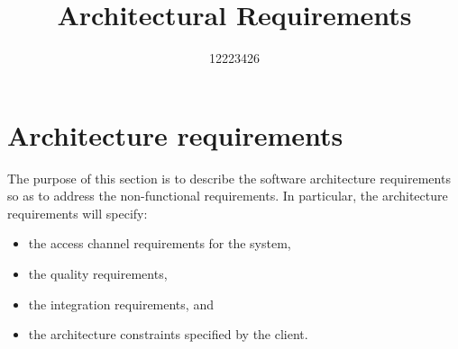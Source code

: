 \documentclass[11pt,a4paper]{article}
\begin{document}
\begin{titlepage}
\title{Architectural Requirements}
\author{12223426}
\maketitle
\end{titlepage}

\section{Architecture requirements}
The purpose of this section is to describe the software architecture requirements so as to address the non-functional requirements. In particular, the architecture requirements will specify:
\begin{itemize}
	\item the access channel requirements for the system,
	\item the quality requirements,
	\item the integration requirements, and
	\item the architecture constraints specified by the client.
\end{itemize}
 
\end{document}
